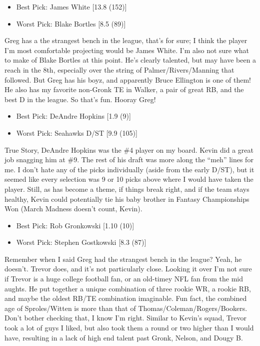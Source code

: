 \documentclass[11pt,letterpaper]{article}
\begin{document}
\newpage
{}
\begin{itemize}
\item Best Pick: James White [13.8 (152)]
\item Worst Pick: Blake Bortles [8.5 (89)]
\end{itemize}
Greg has a the strangest bench in the league, that's for sure; I think the player I'm most comfortable projecting would be James White. I'm also not sure what to make of Blake Bortles at this point. He's clearly talented, but may have been a reach in the 8th, especially over the string of Palmer/Rivers/Manning that followed. But Greg has his boyz, and apparently Bruce Ellington is one of them! He also has my favorite non-Gronk TE in Walker, a pair of great RB, and the best D in the league. So that's fun. Hooray Greg!

\begin{itemize}
\item Best Pick: DeAndre Hopkins [1.9 (9)]
\item Worst Pick: Seahawks D/ST [9.9 (105)]
\end{itemize}
True Story, DeAndre Hopkins was the \#4 player on my board. Kevin did a great job snagging him at \#9. The rest of his draft was more along the ``meh'' lines for me. I don't hate any of the picks individually (aside from the early D/ST), but it seemed like every selection was 9 or 10 picks above where I would have taken the player. Still, as has become a theme, if things break right, and if the team stays healthy, Kevin could potentially tie his baby brother in Fantasy Championships Won (March Madness doesn't count, Kevin).

\begin{itemize}
\item Best Pick: Rob Gronkowski [1.10 (10)]
\item Worst Pick: Stephen Gostkowski [8.3 (87)]
\end{itemize}
Remember when I said Greg had the strangest bench in the league? Yeah, he doesn't. Trevor does, and it's not particularly close. Looking it over I'm not sure if Trevor is a huge college football fan, or an old-timey NFL fan from the mid aughts. He put together a unique combination of three rookie WR, a rookie RB, and maybe the oldest RB/TE combination imaginable. Fun fact, the combined age of Sproles/Witten is more than that of Thomas/Coleman/Rogers/Bookers. Don't bother checking that, I know I'm right. Similar to Kevin's squad, Trevor took a lot of guys I liked, but also took them a round or two higher than I would have, resulting in a lack of high end talent past Gronk, Nelson, and Dougy B.
\end{document}
